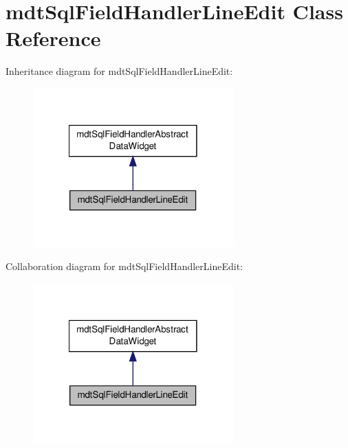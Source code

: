 \hypertarget{classmdt_sql_field_handler_line_edit}{\section{mdt\-Sql\-Field\-Handler\-Line\-Edit Class Reference}
\label{classmdt_sql_field_handler_line_edit}
}


Inheritance diagram for mdt\-Sql\-Field\-Handler\-Line\-Edit\-:
\nopagebreak
\begin{figure}[H]
\begin{center}
\leavevmode
\includegraphics[width=218pt]{classmdt_sql_field_handler_line_edit__inherit__graph}
\end{center}
\end{figure}


Collaboration diagram for mdt\-Sql\-Field\-Handler\-Line\-Edit\-:
\nopagebreak
\begin{figure}[H]
\begin{center}
\leavevmode
\includegraphics[width=218pt]{classmdt_sql_field_handler_line_edit__coll__graph}
\end{center}
\end{figure}
